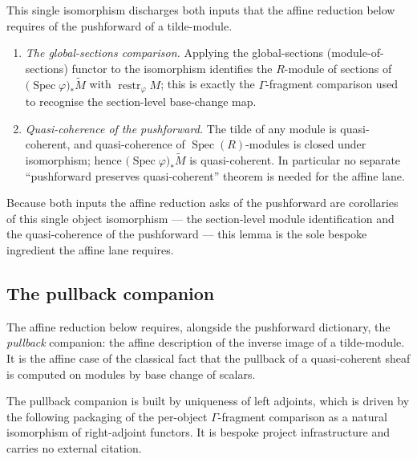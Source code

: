 \begin{remark}
  This single isomorphism discharges both inputs that the affine reduction below
  requires of the pushforward of a tilde-module.
  \begin{enumerate}
    \item \emph{The global-sections comparison.} Applying the global-sections
      (module-of-sections) functor to the isomorphism identifies the
      \(R\)-module of sections of
      \(\bigl(\operatorname{Spec}\varphi\bigr)_*\widetilde{M}\) with
      \(\operatorname{restr}_\varphi M\); this is exactly the \(\Gamma\)-fragment
      comparison used to recognise the section-level base-change map.
    \item \emph{Quasi-coherence of the pushforward.} The tilde of any module is
      quasi-coherent, and quasi-coherence of \(\operatorname{Spec}(R)\)-modules is
      closed under isomorphism; hence
      \(\bigl(\operatorname{Spec}\varphi\bigr)_*\widetilde{M}\) is quasi-coherent.
      In particular no separate ``pushforward preserves quasi-coherent'' theorem is
      needed for the affine lane.
  \end{enumerate}
  Because both inputs the affine reduction asks of the pushforward are corollaries
  of this single object isomorphism — the section-level module identification and
  the quasi-coherence of the pushforward — this lemma is the sole bespoke
  ingredient the affine lane requires.
\end{remark}

\subsection{The pullback companion}

The affine reduction below requires, alongside the pushforward dictionary, the
\emph{pullback} companion: the affine description of the inverse image of a
tilde-module. It is the affine case of the classical fact that the pullback of a
quasi-coherent sheaf is computed on modules by base change of scalars.

The pullback companion is built by uniqueness of left adjoints, which is driven by
the following packaging of the per-object \(\Gamma\)-fragment comparison as a
natural isomorphism of right-adjoint functors. It is bespoke project
infrastructure and carries no external citation.

